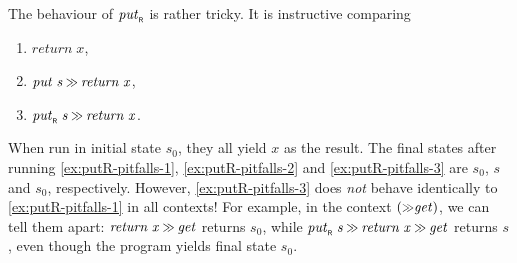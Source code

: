 \documentclass{llncs}
\newcommand{\Varid}[1]{\mathit{#1}}
\let\Varid\mathit
\begin{document}
The behaviour of \ensuremath{\Varid{put}_{\scaleobj{0.7}{\sf R}}} is rather tricky. It is instructive comparing
\begin{enumerate}[label=(\alph*)]
\item \ensuremath{\Varid{return}\;\Varid{x}},  \label{ex:putR-pitfalls-1}
\item \ensuremath{\Varid{put}\;\Varid{s}\mathbin{\hstretch{0.7}{>\!\!>}}\Varid{return}\;\Varid{x}}, \label{ex:putR-pitfalls-2}
\item \ensuremath{\Varid{put}_{\scaleobj{0.7}{\sf R}}\;\Varid{s}\mathbin{\hstretch{0.7}{>\!\!>}}\Varid{return}\;\Varid{x}}. \label{ex:putR-pitfalls-3}
\end{enumerate}
When run in initial state \ensuremath{\Varid{s}_{0}}, they all yield \ensuremath{\Varid{x}} as the result.
The final states after running \ref{ex:putR-pitfalls-1}, \ref{ex:putR-pitfalls-2} and \ref{ex:putR-pitfalls-3} are \ensuremath{\Varid{s}_{0}}, \ensuremath{\Varid{s}} and \ensuremath{\Varid{s}_{0}}, respectively.
However, \ref{ex:putR-pitfalls-3} does {\em not} behave identically to \ref{ex:putR-pitfalls-1} in all contexts!
For example, in the context \ensuremath{(\mathbin{\hstretch{0.7}{>\!\!>}}\Varid{get})}, we can tell them apart:
\ensuremath{\Varid{return}\;\Varid{x}\mathbin{\hstretch{0.7}{>\!\!>}}\Varid{get}} returns \ensuremath{\Varid{s}_{0}}, while \ensuremath{\Varid{put}_{\scaleobj{0.7}{\sf R}}\;\Varid{s}\mathbin{\hstretch{0.7}{>\!\!>}}\Varid{return}\;\Varid{x}\mathbin{\hstretch{0.7}{>\!\!>}}\Varid{get}} returns \ensuremath{\Varid{s}}, even though the program yields final state \ensuremath{\Varid{s}_{0}}.
\end{document}

